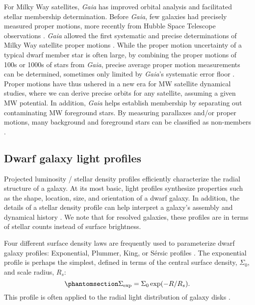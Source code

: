 For Milky Way satellites, \emph{Gaia} has improved orbital analysis and
facilitated stellar membership determination. Before \emph{Gaia}, few
galaxies had precisely measured proper motions, more recently from
Hubble Space Telescope observations \citep[e.g.,][]{sohn+2017}.
\emph{Gaia} allowed the first systematic and precise determinations of
Milky Way satellite proper motions \citep{pace+li2019, MV2020a}. While
the proper motion uncertainty of a typical dwarf member star is often
large, by combining the proper motions of 100s or 1000s of stars from
\emph{Gaia}, precise average proper motion measurements can be
determined, sometimes only limited by \emph{Gaia}'s systematic error
floor \citep[e.g.,][]{MV2020a}. Proper motions have thus ushered in a
new era for MW satellite dynamical studies, where we can derive precise
orbits for any satellite, assuming a given MW potential. In addition,
\emph{Gaia} helps establish membership by separating out contaminating
MW foreground stars. By measuring parallaxes and/or proper motions, many
background and foreground stars can be classified as non-members
\citep[e.g.,][]{battaglia+2022, jensen+2024}.

\subsection{Dwarf galaxy light profiles}\label{sec:exponential_profiles}

Projected luminosity / stellar density profiles efficiently characterize
the radial structure of a galaxy. At its most basic, light profiles
synthesize properties such as the shape, location, size, and orientation
of a dwarf galaxy. In addition, the details of a stellar density profile
can help interpret a galaxy's assembly and dynamical history
\citep[e.g.,][]{penarrubia+2009, lee+2018, querci+2025}. We note that
for resolved galaxies, these profiles are in terms of stellar counts
instead of surface brightness.

Four different surface density laws are frequently used to parameterize
dwarf galaxy profiles: Exponential, Plummer, King, or Sérsic profiles
\citep[e.g.,][]{munoz+2018}. The exponential profile is perhaps the
simplest, defined in terms of the central surface density, \(\Sigma_0\),
and scale radius, \(R_s\):
\begin{equation}\protect\phantomsection\label{eq:exponential_law}{
\Sigma_{\rm exp} = \Sigma_0\exp(-R / R_s).
}\end{equation} This profile is often applied to the radial light
distribution of galaxy disks
\citep{devaucouleurs1959a, freeman1970, kent1985}.

